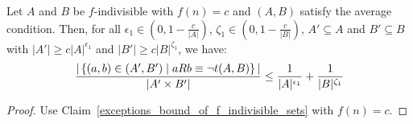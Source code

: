     \begin{corollary}[Corollary 4.9]
        Let $A$ and $B$ be $f$-indivisible with $f(n) = c$ and $(A,B)$ satisfy the average condition.
        Then, for all $\epsilon_1 \in (0, 1 - \frac{c}{|A|})$, $\zeta_1 \in (0, 1 - \frac{c}{|B|})$, $A' \subseteq A$ and
            $B' \subseteq B$ with $|A'| \geq c |A|^{\epsilon_1}$ and $|B'| \geq c |B|^{\zeta_1}$, we have:
        \[
            \frac{|\left\{ (a,b) \in (A',B') \mid a R b \equiv \neg t(A,B) \right\}|}{|A' \times B'|} \leq
                \frac{1}{|A|^{\epsilon_1}} + \frac{1}{|B|^{\zeta_1}}
        \]
        \begin{proof}
            Use Claim~\ref{exceptions_bound_of_f_indivisible_sets} with $f(n) = c$.
        \end{proof}
    \end{corollary}

